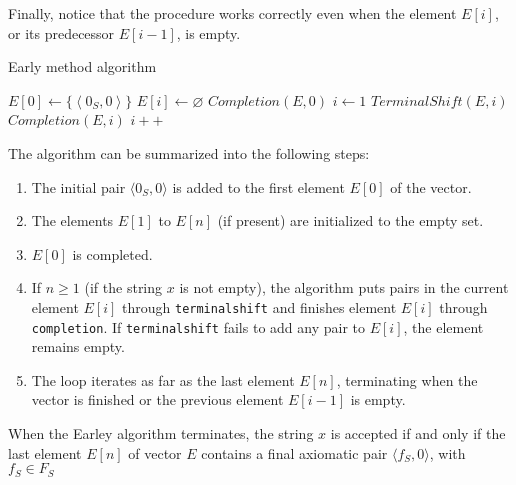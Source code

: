 Finally, notice that the procedure works correctly even when the element $E[i]$, or its predecessor $E[i-1]$, is empty.
\begin{algorithm}[H]
  \caption{Early method algorithm}
      \begin{algorithmic}[1]
          \State $E[0] \leftarrow \{\left\langle 0_S,0 \right\rangle \}$
              \State $E[i] \leftarrow \varnothing$
          \EndFor
          \State $Completion(E,0)$
          \State $i \leftarrow 1$
              \State $TerminalShift(E,i)$
              \State $Completion(E,i)$
              \State $i++$
          \EndWhile 
      \end{algorithmic}
\end{algorithm}

The algorithm can be summarized into the following steps:
\begin{enumerate}
    \item The initial pair $\langle 0_S, 0 \rangle$ is added to the first element $E[0]$ of the vector.
    \item The elements $E[1]$ to $E[n]$ (if present) are initialized to the empty set. 
    \item $E[0]$ is completed.
    \item If $n \geq 1$ (if the string $x$ is not empty), the algorithm puts pairs in the current element $E[i]$ through \texttt{terminalshift} and finishes element $E[i]$ through \texttt{completion}.
        If \texttt{terminalshift} fails to add any pair to $E[i]$, the element remains empty.
    \item The loop iterates as far as the last element $E[n]$, terminating when the vector is finished or the previous element $E[i-1]$ is empty. 
\end{enumerate}

\begin{property}
    When the Earley algorithm terminates, the string $x$ is accepted if and only if the last element $E[n]$ of vector $E$ contains a final axiomatic pair $\langle f_S, 0 \rangle$, with $f_S \in F_S$
\end{property}

